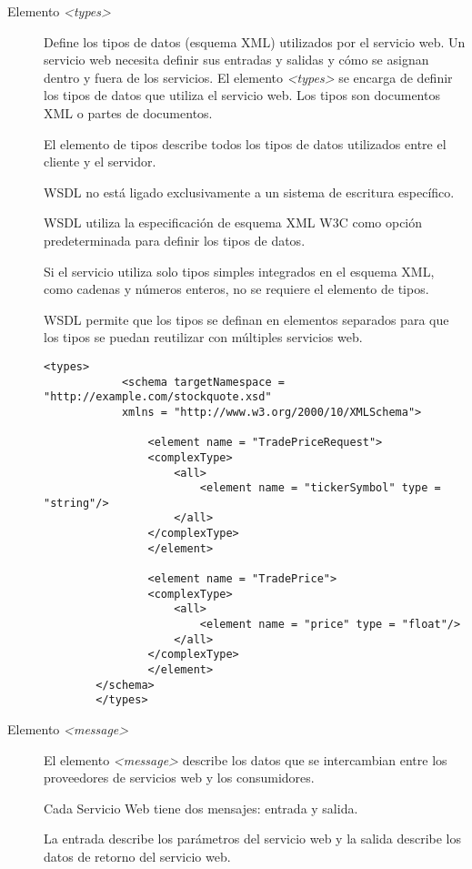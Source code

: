  \begin{description}
 	\item  [Elemento \textit{<types>}] Define los tipos de datos (esquema XML) utilizados por el servicio web. 
 	Un servicio web necesita definir sus entradas y salidas y cómo se asignan dentro y fuera de los servicios. El elemento \textit{<types>} se encarga de definir los tipos de datos que utiliza el servicio web. Los tipos son documentos XML o partes de documentos.
 	
 	El elemento de tipos describe todos los tipos de datos utilizados entre el cliente y el servidor.
 	
 	WSDL no está ligado exclusivamente a un sistema de escritura específico.
 	
 	WSDL utiliza la especificación de esquema XML W3C como opción predeterminada para definir los tipos de datos.
 	
 	Si el servicio utiliza solo tipos simples integrados en el esquema XML, como cadenas y números enteros, no se requiere el elemento de tipos.
 	
 	WSDL permite que los tipos se definan en elementos separados para que los tipos se puedan reutilizar con múltiples servicios web.
 	
 	\begin{lstlisting}[label=wsdl:types, caption= Descripci\'on de elemento \textit{<types>}. Tomado de \cite{W3C2022}]
		<types>
			<schema targetNamespace = "http://example.com/stockquote.xsd"
			xmlns = "http://www.w3.org/2000/10/XMLSchema">
		
				<element name = "TradePriceRequest">
				<complexType>
					<all>
						<element name = "tickerSymbol" type = "string"/>
					</all>
				</complexType>
				</element>
		
				<element name = "TradePrice">
				<complexType>
					<all>
						<element name = "price" type = "float"/>
					</all>
				</complexType>
				</element>	
		</schema>
		</types>
 	\end{lstlisting}
 	
 	
 	\item  [Elemento \textit{<message>}] 	
 	El elemento \textit{<message>} describe los datos que se intercambian entre los proveedores de servicios web y los consumidores.
 	
 	Cada Servicio Web tiene dos mensajes: entrada y salida.
 	
 	La entrada describe los parámetros del servicio web y la salida describe los datos de retorno del servicio web.
 	

\end{description}
